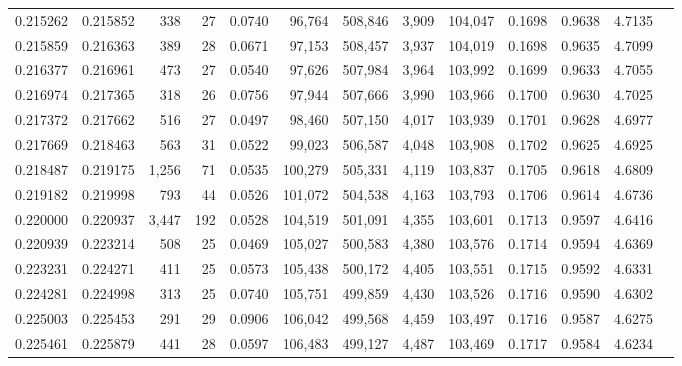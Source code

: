 \begin{tabular}{rrrrrrrrrrrrr}
0.215262 & 0.215852 &   338 &  27 &                                     0.0740 &  96,764 & 508,846 &   3,909 & 104,047 & 0.1698 & 0.9638 & 4.7135 \\
0.215859 & 0.216363 &   389 &  28 &                                     0.0671 &  97,153 & 508,457 &   3,937 & 104,019 & 0.1698 & 0.9635 & 4.7099 \\
0.216377 & 0.216961 &   473 &  27 &                                     0.0540 &  97,626 & 507,984 &   3,964 & 103,992 & 0.1699 & 0.9633 & 4.7055 \\
0.216974 & 0.217365 &   318 &  26 &                                     0.0756 &  97,944 & 507,666 &   3,990 & 103,966 & 0.1700 & 0.9630 & 4.7025 \\
0.217372 & 0.217662 &   516 &  27 &                                     0.0497 &  98,460 & 507,150 &   4,017 & 103,939 & 0.1701 & 0.9628 & 4.6977 \\
0.217669 & 0.218463 &   563 &  31 &                                     0.0522 &  99,023 & 506,587 &   4,048 & 103,908 & 0.1702 & 0.9625 & 4.6925 \\
0.218487 & 0.219175 & 1,256 &  71 &                                     0.0535 & 100,279 & 505,331 &   4,119 & 103,837 & 0.1705 & 0.9618 & 4.6809 \\
0.219182 & 0.219998 &   793 &  44 &                                     0.0526 & 101,072 & 504,538 &   4,163 & 103,793 & 0.1706 & 0.9614 & 4.6736 \\
0.220000 & 0.220937 & 3,447 & 192 &                                     0.0528 & 104,519 & 501,091 &   4,355 & 103,601 & 0.1713 & 0.9597 & 4.6416 \\
0.220939 & 0.223214 &   508 &  25 &                                     0.0469 & 105,027 & 500,583 &   4,380 & 103,576 & 0.1714 & 0.9594 & 4.6369 \\
0.223231 & 0.224271 &   411 &  25 &                                     0.0573 & 105,438 & 500,172 &   4,405 & 103,551 & 0.1715 & 0.9592 & 4.6331 \\
0.224281 & 0.224998 &   313 &  25 &                                     0.0740 & 105,751 & 499,859 &   4,430 & 103,526 & 0.1716 & 0.9590 & 4.6302 \\
0.225003 & 0.225453 &   291 &  29 &                                     0.0906 & 106,042 & 499,568 &   4,459 & 103,497 & 0.1716 & 0.9587 & 4.6275 \\
0.225461 & 0.225879 &   441 &  28 &                                     0.0597 & 106,483 & 499,127 &   4,487 & 103,469 & 0.1717 & 0.9584 & 4.6234 \\

\end{tabular}
